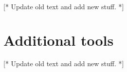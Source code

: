 [* Update old text and add new stuff. *]





\section{Additional tools}
\label{sec:intro:tools}

[* Update old text and add new stuff. *]




